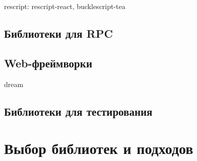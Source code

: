 rescript: rescript-react, bucklescript-tea

\subsection{Библиотеки для RPC}

\TODO

\subsection{Web-фреймворки}

dream  \TODO

\subsection{Библиотеки для тестирования}

\TODO

\section{Выбор библиотек и подходов}

\TODO
